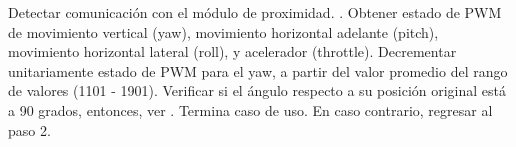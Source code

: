 
\begin{UCtrayectoria}
	\UCpaso [\UCactor] Detectar comunicación con el módulo de proximidad. 
		.
	\UCpaso Obtener estado de PWM de movimiento vertical (yaw), movimiento 
	horizontal adelante (pitch), movimiento horizontal lateral (roll), 
	y acelerador (throttle).
	\UCpaso Decrementar unitariamente estado de PWM para el yaw, a partir 
	del valor promedio del rango de valores (1101 - 1901).
	\UCpaso Verificar si el ángulo respecto a su posición original está a 90 
		grados, entonces, ver . Termina caso de uso.
		En caso contrario, regresar al paso 2. 
\end{UCtrayectoria}









